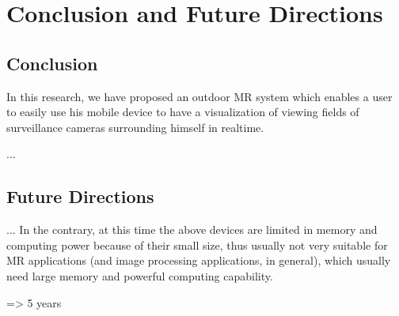 \chapter{Conclusion and Future Directions}
\label{Chapter6}

\section{Conclusion}

In this research, we have proposed an outdoor MR system which enables a user to easily use his mobile device to have a visualization of viewing fields of surveillance cameras surrounding himself in realtime.

...

\section{Future Directions}

...
In the contrary, at this time the above devices are limited in memory and computing power because of their small size, thus usually not very suitable for MR applications (and image processing applications, in general), which usually need large memory and powerful computing capability.

=> 5 years